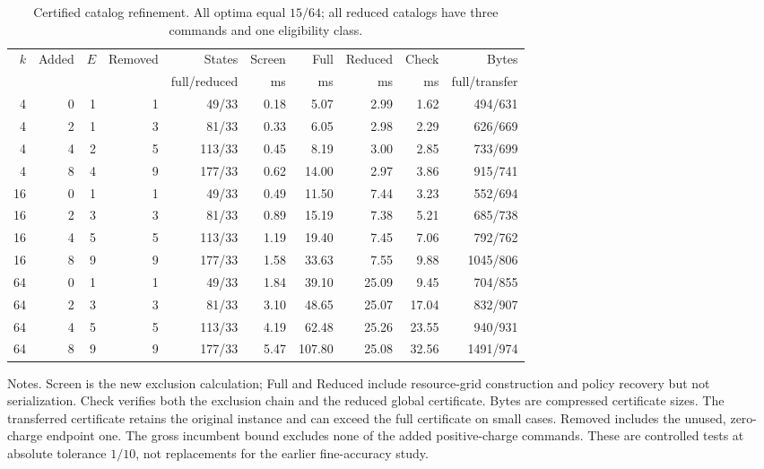 \begin{table}[p]\centering
\caption{Certified catalog refinement. All optima equal $15/64$; all reduced catalogs have three commands and one eligibility class.}\label{tab:screen53}
\small\setlength{\tabcolsep}{3pt}
\begin{tabular}{rrrrrrrrrr}
\toprule
$k$ & Added & $E$ & Removed & States & Screen & Full & Reduced & Check & Bytes\\
 & & & & full/reduced & ms & ms & ms & ms & full/transfer\\
\midrule
4 & 0 & 1 & 1 & 49/33 & 0.18 & 5.07 & 2.99 & 1.62 & 494/631 \\
4 & 2 & 1 & 3 & 81/33 & 0.33 & 6.05 & 2.98 & 2.29 & 626/669 \\
4 & 4 & 2 & 5 & 113/33 & 0.45 & 8.19 & 3.00 & 2.85 & 733/699 \\
4 & 8 & 4 & 9 & 177/33 & 0.62 & 14.00 & 2.97 & 3.86 & 915/741 \\
16 & 0 & 1 & 1 & 49/33 & 0.49 & 11.50 & 7.44 & 3.23 & 552/694 \\
16 & 2 & 3 & 3 & 81/33 & 0.89 & 15.19 & 7.38 & 5.21 & 685/738 \\
16 & 4 & 5 & 5 & 113/33 & 1.19 & 19.40 & 7.45 & 7.06 & 792/762 \\
16 & 8 & 9 & 9 & 177/33 & 1.58 & 33.63 & 7.55 & 9.88 & 1045/806 \\
64 & 0 & 1 & 1 & 49/33 & 1.84 & 39.10 & 25.09 & 9.45 & 704/855 \\
64 & 2 & 3 & 3 & 81/33 & 3.10 & 48.65 & 25.07 & 17.04 & 832/907 \\
64 & 4 & 5 & 5 & 113/33 & 4.19 & 62.48 & 25.26 & 23.55 & 940/931 \\
64 & 8 & 9 & 9 & 177/33 & 5.47 & 107.80 & 25.08 & 32.56 & 1491/974 \\
\bottomrule
\end{tabular}
\par\smallskip\begin{minipage}{0.98\textwidth}\small
Notes. Screen is the new exclusion calculation; Full and Reduced include resource-grid construction and policy recovery but not serialization. Check verifies both the exclusion chain and the reduced global certificate. Bytes are compressed certificate sizes. The transferred certificate retains the original instance and can exceed the full certificate on small cases. Removed includes the unused, zero-charge endpoint one. The gross incumbent bound excludes none of the added positive-charge commands. These are controlled tests at absolute tolerance $1/10$, not replacements for the earlier fine-accuracy study.\end{minipage}
\end{table}
